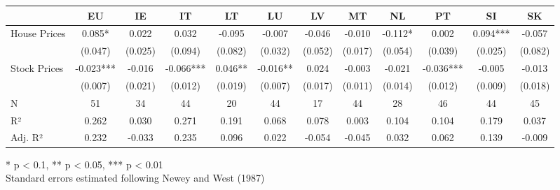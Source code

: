 \begin{table}[h]
\fontsize{7.5pt}{9.0pt}\selectfont
\begin{tabular*}{\linewidth}{@{\extracolsep{\fill}}lccccccccccc}
\toprule
  & EU & IE & IT & LT & LU & LV & MT & NL & PT & SI & SK \\ 
\midrule\addlinespace[2.5pt]
House Prices & 0.085* & 0.022 & 0.032 & -0.095 & -0.007 & -0.046 & -0.010 & -0.112* & 0.002 & 0.094*** & -0.057 \\ 
 & (0.047) & (0.025) & (0.094) & (0.082) & (0.032) & (0.052) & (0.017) & (0.054) & (0.039) & (0.025) & (0.082) \\ 
Stock Prices & -0.023*** & -0.016 & -0.066*** & 0.046** & -0.016** & 0.024 & -0.003 & -0.021 & -0.036*** & -0.005 & -0.013 \\ 
{} & {(0.007)} & {(0.021)} & {(0.012)} & {(0.019)} & {(0.007)} & {(0.017)} & {(0.011)} & {(0.014)} & {(0.012)} & {(0.009)} & {(0.018)} \\ 
N & 51 & 34 & 44 & 20 & 44 & 17 & 44 & 28 & 46 & 44 & 45 \\ 
R² & 0.262 & 0.030 & 0.271 & 0.191 & 0.068 & 0.078 & 0.003 & 0.104 & 0.104 & 0.179 & 0.037 \\ 
Adj. R² & 0.232 & -0.033 & 0.235 & 0.096 & 0.022 & -0.054 & -0.045 & 0.032 & 0.062 & 0.139 & -0.009 \\ 
\bottomrule
\end{tabular*}
\begin{minipage}{\linewidth}
* p < 0.1, ** p < 0.05, *** p < 0.01\\
Standard errors estimated following Newey and West (1987)\\
\end{minipage}
\end{table}

